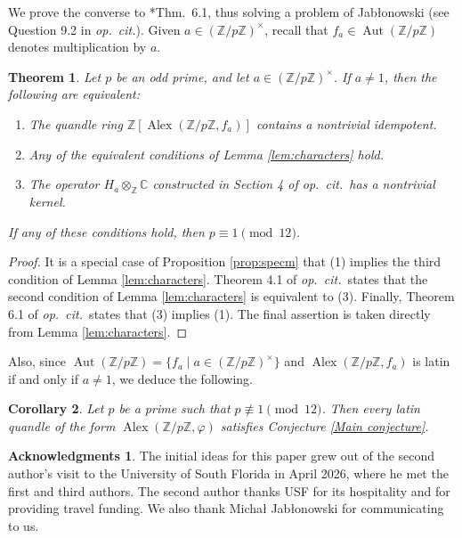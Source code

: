 \documentclass[12pt]{amsart}
\newtheorem{thm}{Theorem}[section]
\newtheorem{cor}[thm]{Corollary}
\theoremstyle{definition}
\newtheorem*{ack}{Acknowledgments}
\theoremstyle{remark}
\newcommand{\C}{\mathbb{C}}
\newcommand{\Z}{\mathbb{Z}}
\renewcommand{\phi}{\varphi}
\def\Aut{\operatorname{Aut}}
\def\Alex{\operatorname{Alex}}
\begin{document}
We prove the converse to \cite{counterexample}*{Thm.\ 6.1}, thus solving a problem of Jab\l onowski (see Question 9.2 in \emph{op.\ cit.}). Given $a\in(\Z/p\Z)^\times$, recall that $f_a\in\Aut(\Z/p\Z)$ denotes multiplication by $a$.
\begin{thm}\label{thm:jab}
    Let $p$ be an odd prime, and let $a\in(\Z/p\Z)^\times$. If $a\neq 1$, then the following are equivalent:
    \begin{enumerate}
        \item The quandle ring $\Z[\Alex(\Z/p\Z,f_a)]$ contains a nontrivial idempotent.
        \item Any of the equivalent conditions of Lemma \ref{lem:characters} hold.
        \item The operator $H_a\otimes_\Z\C$ constructed in Section 4 of \emph{op.\ cit.\ }has a nontrivial kernel.
    \end{enumerate}
    If any of these conditions hold, then $p\equiv 1\pmod{12}$.
\end{thm}

\begin{proof}
    It is a special case of Proposition \ref{prop:specm} that (1) implies the third condition of Lemma \ref{lem:characters}. 
    Theorem 4.1 of \emph{op.\ cit.\ }states that the second condition of Lemma \ref{lem:characters} is equivalent to (3). Finally, Theorem 6.1 of \emph{op.\ cit.\ }states that (3) implies (1). The final assertion is taken directly from Lemma \ref{lem:characters}.
\end{proof}

Also, since $\Aut(\Z/p\Z)=\{f_a\mid a\in(\Z/p\Z)^\times\}$ and $\Alex(\Z/p\Z,f_a)$ is latin if and only if $a\neq 1$, we deduce the following.

\begin{cor}\label{cor:primes}
    Let $p$ be a prime such that $p\not\equiv 1\pmod{12}$. Then every latin quandle of the form $\Alex(\Z/p\Z,\phi)$ satisfies Conjecture \ref{Main conjecture}.
\end{cor}


\begin{ack}
    The initial ideas for this paper grew out of the second author's visit to the University of South Florida in April 2026, where he met the first and third authors. The second author thanks USF for its hospitality and for providing travel funding. We also thank {Micha\l} Jab\l onowski for communicating \cite{counterexample} to us.
\end{ack}
\end{document}
